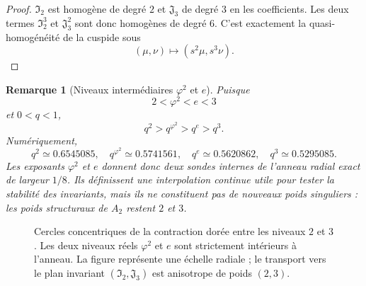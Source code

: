 \documentclass[11pt,a4paper]{article}
\newtheorem{remark}[theorem]{Remarque}
\newcommand{\ph}{\varphi}
\begin{document}
\begin{proof}
$\mathfrak I_2$ est homogène de degré $2$ et $\mathfrak J_3$ de degré $3$ en les coefficients. Les deux termes $\mathfrak I_2^3$ et $\mathfrak J_3^2$ sont donc homogènes de degré $6$. C'est exactement la quasi-homogénéité de la cuspide sous
\[
 (\mu,\nu)\mapsto(s^2\mu,s^3\nu).
\]
\end{proof}

\begin{remark}[Niveaux intermédiaires $\ph^2$ et $e$]
Puisque
\[
 2<\ph^2<e<3
\]
et $0<q<1$,
\[
 q^2>q^{\ph^2}>q^e>q^3.
\]
Numériquement,
\[
 q^2\simeq0.6545085,\quad
 q^{\ph^2}\simeq0.5741561,\quad
 q^e\simeq0.5620862,\quad
 q^3\simeq0.5295085.
\]
Les exposants $\ph^2$ et $e$ donnent donc deux sondes internes de l'anneau radial exact de largeur $1/8$. Ils définissent une interpolation continue utile pour tester la stabilité des invariants, mais ils ne constituent pas de nouveaux poids singuliers : les poids structuraux de $A_2$ restent $2$ et $3$.
\end{remark}

\begin{figure}[htbp]
\centering
{}
\caption{Cercles concentriques de la contraction dorée entre les niveaux $2$ et $3$. Les deux niveaux réels $\ph^2$ et $e$ sont strictement intérieurs à l'anneau. La figure représente une échelle radiale ; le transport vers le plan invariant $(\mathfrak I_2,\mathfrak J_3)$ est anisotrope de poids $(2,3)$.}
\label{fig:golden-concentric-A2}
\end{figure}
\end{document}
